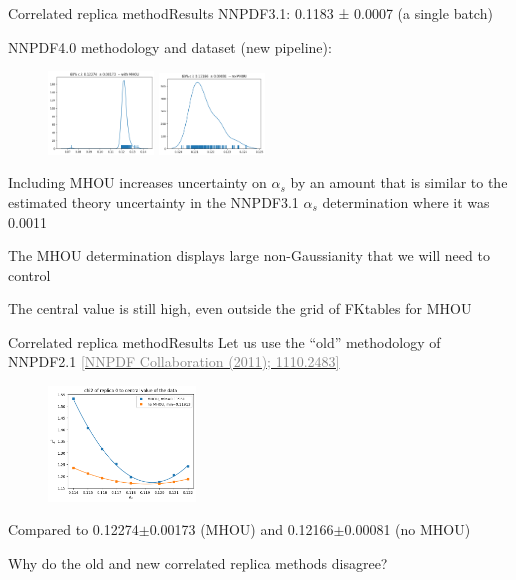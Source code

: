 \documentclass[aspectratio=169, 8pt,t]{beamer}
\begin{document}
\begin{frame}{Correlated replica method}{Results}
  NNPDF3.1: 0.1183 ± 0.0007 (a single batch)

  \vspace*{1em}
  NNPDF4.0 methodology and dataset (new pipeline):
  \begin{figure}
    \includegraphics[width=0.25\textwidth]{withmhou_kdeplot.png}
    \includegraphics[width=0.25\textwidth]{nomhou_kdeplot.png}
  \end{figure}
  Including MHOU increases uncertainty on $\alpha_s$ by an amount that is similar to the estimated theory uncertainty in the NNPDF3.1 $\alpha_s$ determination where it was 0.0011

  \vspace*{0.5em}
  The MHOU determination displays large non-Gaussianity that we will need to control

  \vspace*{0.5em}
  The central value is still high, even outside the grid of FKtables for MHOU
\end{frame}


\begin{frame}{Correlated replica method}{Results}
  Let us use the ``old'' methodology of NNPDF2.1 \href{https://arxiv.org/abs/1110.2483}{\textcolor{gray}{[NNPDF Collaboration (2011); 1110.2483]}}

  \begin{figure}
    \includegraphics[width=0.35\textwidth]{naivechi2fit.png}
  \end{figure}
  \centering
  Compared to 0.12274$\pm$0.00173 (MHOU) and 0.12166$\pm$0.00081 (no MHOU)

  \vspace*{0.5em}
  Why do the old and new correlated replica methods disagree?
\end{frame}
\end{document}
